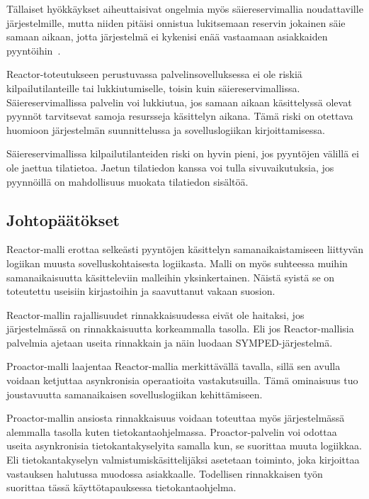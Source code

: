 \documentclass[finnish]{tktltiki2}
\theoremstyle{definition}
\theoremstyle{remark}
\begin{document}
Tällaiset hyökkäykset aiheuttaisivat ongelmia myös säiereservimallia
noudattaville järjestelmille, mutta niiden pitäisi onnistua
lukitsemaan reservin jokainen säie samaan aikaan, jotta
järjestelmä ei kykenisi enää vastaamaan asiakkaiden pyyntöihin~\cite{davis_case_2017}.

Reactor-toteutukseen perustuvassa palvelinsovelluksessa ei ole
riskiä kilpailutilanteille tai lukkiutumiselle, toisin kuin säiereservimallissa.
Säiereservimallissa palvelin voi lukkiutua, jos samaan aikaan käsittelyssä olevat
pyynnöt tarvitsevat samoja resursseja käsittelyn aikana. Tämä riski on otettava
huomioon järjestelmän suunnittelussa ja sovelluslogiikan kirjoittamisessa.

Säiereservimallissa kilpailutilanteiden riski on hyvin pieni, jos pyyntöjen
välillä ei ole jaettua tilatietoa. Jaetun tilatiedon kanssa voi tulla
sivuvaikutuksia, jos pyynnöillä on mahdollisuus muokata tilatiedon sisältöä.

\subsection{Johtopäätökset}
Reactor-malli erottaa
selkeästi pyyntöjen käsittelyn
samanaikaistamiseen liittyvän
logiikan muusta sovelluskohtaisesta logiikasta.
Malli on myös suhteessa muihin samanaikaisuutta
käsitteleviin malleihin yksinkertainen.
Näistä syistä se on toteutettu useisiin
kirjastoihin ja saavuttanut vakaan suosion.

Reactor-mallin rajallisuudet rinnakkaisuudessa
eivät ole haitaksi, jos järjestelmässä on rinnakkaisuutta
korkeammalla tasolla. Eli
jos Reactor-mallisia palvelmia ajetaan useita rinnakkain
ja näin luodaan SYMPED-järjestelmä.

Proactor-malli laajentaa Reactor-mallia merkittävällä tavalla,
sillä sen avulla voidaan ketjuttaa asynkronisia
operaatioita vastakutsuilla. Tämä ominaisuus
tuo joustavuutta samanaikaisen sovelluslogiikan kehittämiseen.

Proactor-mallin ansiosta rinnakkaisuus
voidaan toteuttaa myös järjestelmässä alemmalla
tasolla kuten tietokantaohjelmassa.
Proactor-palvelin voi odottaa useita asynkronisia
tietokantakyselyita samalla kun, se suorittaa
muuta logiikkaa. Eli tietokantakyselyn valmistumiskäsittelijäksi
asetetaan toiminto, joka kirjoittaa vastauksen
halutussa muodossa asiakkaalle.
Todellisen rinnakkaisen työn
suorittaa tässä käyttötapauksessa tietokantaohjelma.
\end{document}
